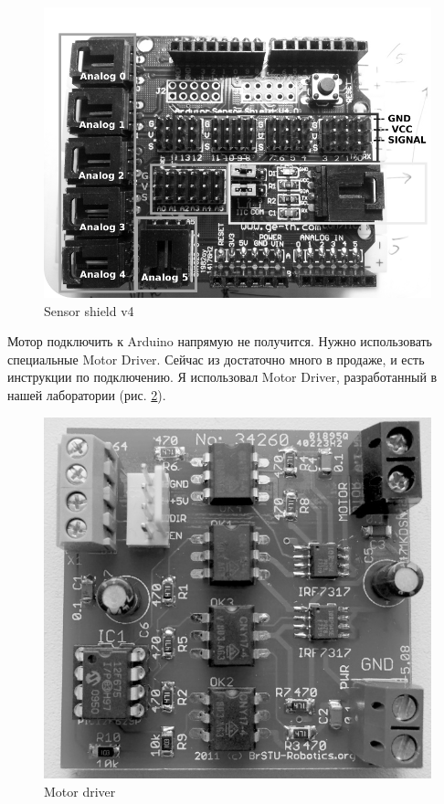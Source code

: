 \documentclass[10pt, a5paper]{article}
\begin{document}
\begin{figure}[h!]
  \centering 
  \includegraphics[scale=0.3]{12_2015_fig3}
  \caption{Sensor shield v4}\label{sklipus3}
\end{figure}

Мотор подключить к Arduino напрямую не получится. Нужно использовать специальные Motor Driver. Сейчас из достаточно много в продаже, и есть инструкции по подключению. Я использовал Motor Driver, разработанный в нашей лаборатории (рис. \ref{sklipus4}).

\begin{figure}[h!]
  \centering 
  \includegraphics[scale=0.2]{12_2015_fig4}
  \caption{Motor driver}\label{sklipus4}
\end{figure}
\end{document}
